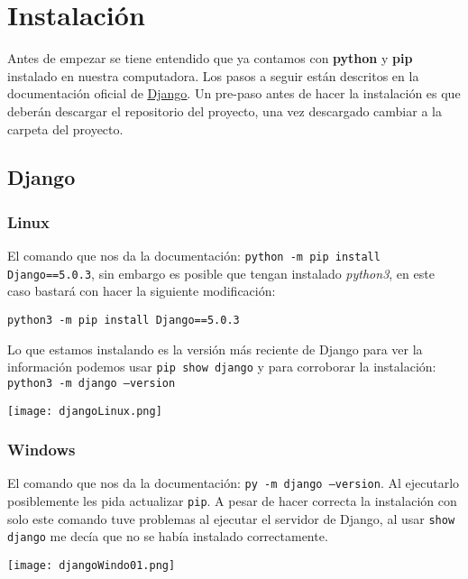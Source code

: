 \section{Instalación}

Antes de empezar se tiene entendido que ya contamos con \textbf{python} y \textbf{pip} instalado en nuestra computadora. Los pasos a seguir están descritos en la documentación oficial de \href{https://www.djangoproject.com/}{\underline{Django}}. Un pre-paso antes de hacer la instalación es que deberán descargar el repositorio del proyecto, una vez descargado cambiar a la carpeta del proyecto.

\subsection{Django}

\subsubsection*{Linux}

El comando que nos da la documentación: \texttt{python -m pip install Django==5.0.3}, sin embargo es posible que tengan instalado \textit{python3}, en este caso bastará con hacer la siguiente modificación: 
\begin{center}
    \texttt{python3 -m pip install Django==5.0.3}    
\end{center}
Lo que estamos instalando es la versión más reciente de Django para ver la información podemos usar \texttt{pip show django} y para corroborar la instalación: \texttt{python3 -m django --version}

\begin{center}
    \texttt{[image: djangoLinux.png]}
\end{center}

\subsubsection*{Windows}

El comando que nos da la documentación: \texttt{py -m django --version}. Al ejecutarlo posiblemente les pida actualizar \texttt{pip}. A pesar de hacer correcta la instalación con solo este comando tuve problemas al ejecutar el servidor de Django, al usar \texttt{show django} me decía que no se había instalado correctamente.

\begin{center}
    \texttt{[image: djangoWindo01.png]}
\end{center}


